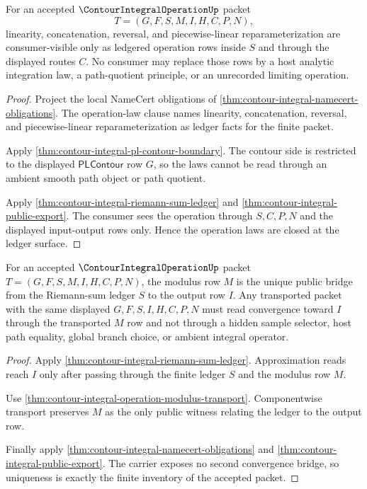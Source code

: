 \begin{theorem}
\label{thm:contour-integral-operation-law-ledger-closure}
For an accepted $\ContourIntegralOperationUp$ packet
$$
T=(G,F,S,M,I,H,C,P,N),
$$
linearity, concatenation, reversal, and piecewise-linear reparameterization are consumer-visible only as ledgered operation rows inside $S$ and through the displayed routes $C$. No consumer may replace those rows by a host analytic integration law, a path-quotient principle, or an unrecorded limiting operation.
\end{theorem}
\begin{proof}
Project the local NameCert obligations of \autoref{thm:contour-integral-namecert-obligations}. The operation-law clause names linearity, concatenation, reversal, and piecewise-linear reparameterization as ledger facts for the finite packet.

Apply \autoref{thm:contour-integral-pl-contour-boundary}. The contour side is restricted to the displayed $\mathsf{PLContour}$ row $G$, so the laws cannot be read through an ambient smooth path object or path quotient.

Apply \autoref{thm:contour-integral-riemann-sum-ledger} and \autoref{thm:contour-integral-public-export}. The consumer sees the operation through $S,C,P,N$ and the displayed input-output rows only. Hence the operation laws are closed at the ledger surface.
\end{proof}

\begin{theorem}
\label{thm:contour-integral-operation-modulus-uniqueness-boundary}
For an accepted $\ContourIntegralOperationUp$ packet $T=(G,F,S,M,I,H,C,P,N)$, the modulus row $M$ is the unique public bridge from the Riemann-sum ledger $S$ to the output row $I$. Any transported packet with the same displayed $G,F,S,I,H,C,P,N$ must read convergence toward $I$ through the transported $M$ row and not through a hidden sample selector, host path equality, global branch choice, or ambient integral operator.
\end{theorem}
\begin{proof}
Apply \autoref{thm:contour-integral-riemann-sum-ledger}. Approximation reads reach $I$ only after passing through the finite ledger $S$ and the modulus row $M$.

Use \autoref{thm:contour-integral-operation-modulus-transport}. Componentwise transport preserves $M$ as the only public witness relating the ledger to the output row.

Finally apply \autoref{thm:contour-integral-namecert-obligations} and \autoref{thm:contour-integral-public-export}. The carrier exposes no second convergence bridge, so uniqueness is exactly the finite inventory of the accepted packet.
\end{proof}

